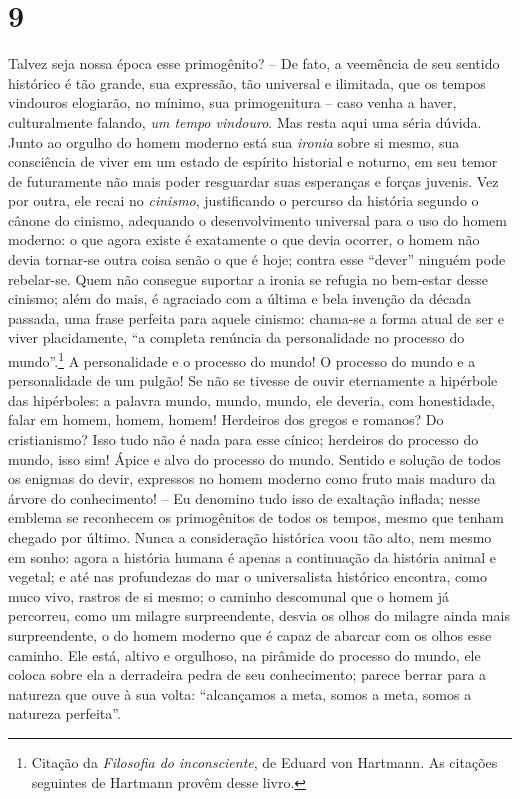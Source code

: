 \chapter{9}\label{capuxedtulo-9}

Talvez seja nossa época esse primogênito? -- De fato, a veemência de
seu sentido histórico é tão grande, sua expressão, tão universal e
ilimitada, que os tempos vindouros elogiarão, no mínimo, sua
primogenitura -- caso venha a haver, culturalmente falando, \emph{um
tempo vindouro}. Mas resta aqui uma séria dúvida. Junto ao orgulho
do homem moderno está sua \emph{ironia} sobre si mesmo, sua
consciência de viver em um estado de espírito historial e noturno,
em seu temor de futuramente não mais poder resguardar suas
esperanças e forças juvenis. Vez por outra, ele recai no
\emph{cinismo}, justificando o percurso da história segundo o cânone
do cinismo, adequando o desenvolvimento universal para o uso do
homem moderno: o que agora existe é exatamente o que devia ocorrer,
o homem não devia tornar-se outra coisa senão o que é hoje; contra
esse ``dever'' ninguém pode rebelar-se. Quem não consegue suportar a
ironia se refugia no bem-estar desse cinismo; além do mais, é
agraciado com a última e bela invenção da década passada, uma frase
perfeita para aquele cinismo: chama-se a forma atual de ser e viver
placidamente, ``a completa renúncia da personalidade no processo do
mundo''.\footnote{Citação da \emph{Filosofia do inconsciente}, de
Eduard von Hartmann. As citações seguintes de Hartmann provêm
desse livro.} A personalidade e o processo do mundo! O processo
do mundo e a personalidade de um pulgão! Se não se tivesse de ouvir
eternamente a hipérbole das hipérboles: a palavra mundo, mundo,
mundo, ele deveria, com honestidade, falar em homem, homem, homem!
Herdeiros dos gregos e romanos? Do cristianismo? Isso tudo não é
nada para esse cínico; herdeiros do processo do mundo, isso sim!
Ápice e alvo do processo do mundo. Sentido e solução de todos os
enigmas do devir, expressos no homem moderno como fruto mais maduro
    da árvore do conhecimento! -- Eu denomino tudo isso de exaltação
    inflada; nesse emblema se reconhecem os primogênitos de todos os
    tempos, mesmo que tenham chegado por último. Nunca a consideração
    histórica voou tão alto, nem mesmo em sonho: agora a história humana
    é apenas a continuação da história animal e vegetal; e até nas
    profundezas do mar o universalista histórico encontra, como muco
    vivo, rastros de si mesmo; o caminho descomunal que o homem já
    percorreu, como um milagre surpreendente, desvia os olhos do milagre
    ainda mais surpreendente, o do homem moderno que é capaz de abarcar
    com os olhos esse caminho. Ele está, altivo e orgulhoso, na pirâmide
    do processo do mundo, ele coloca sobre ela a derradeira pedra de seu
    conhecimento; parece berrar para a natureza que ouve à sua volta:
    ``alcançamos a meta, somos a meta, somos a natureza perfeita''.

